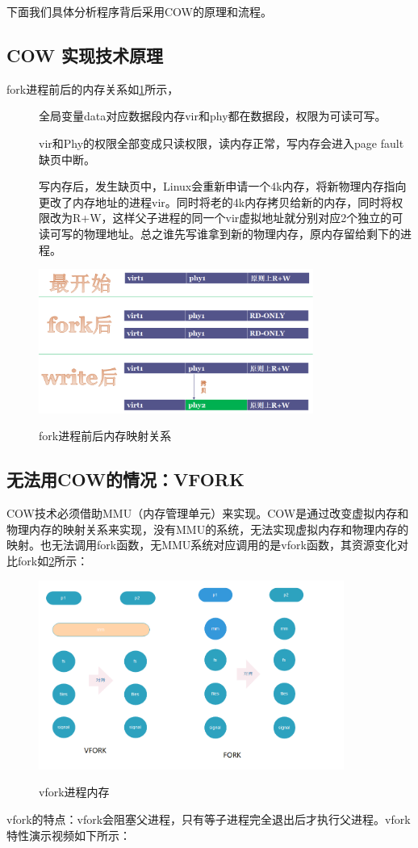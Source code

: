 下面我们具体分析程序背后采用COW的原理和流程。\\
\subsection{COW 实现技术原理}
fork进程前后的内存关系如\ref{linux_fork_mem_compare}所示，
\begin{description}
  \item[] 全局变量data对应数据段内存vir和phy都在数据段，权限为可读可写。
  \item[] vir和Phy的权限全部变成只读权限，读内存正常，写内存会进入page fault缺页中断。
  \item[] 写内存后，发生缺页中，Linux会重新申请一个4k内存，将新物理内存指向更改了内存地址的进程vir。同时将老的4k内存拷贝给新的内存，同时将权限改为R+W，这样父子进程的同一个vir虚拟地址就分别对应2个独立的可读可写的物理地址。总之谁先写谁拿到新的物理内存，原内存留给剩下的进程。
\end{description}
\begin{figure}[H]
 \wdfigbox
  {\caption{fork进程前后内存映射关系}\label{linux_fork_mem_compare}}
  {
  \includegraphics[width=9cm]{./figure/cow_fork_virmem_compare.png}
  }
\end{figure}
\subsection{无法用COW的情况：VFORK}
COW技术必须借助MMU（内存管理单元）来实现。COW是通过改变虚拟内存和物理内存的映射关系来实现，没有MMU的系统，无法实现虚拟内存和物理内存的映射。也无法调用fork函数，无MMU系统对应调用的是vfork函数，其资源变化对比fork如\ref{vfork_mem}所示：
\begin{figure}[H]
 \wdfigbox
  {\caption{vfork进程内存}\label{vfork_mem}}
  {
  \includegraphics[width=10cm]{./figure/vfork_mem.png}
  }
\end{figure}
vfork的特点：vfork会阻塞父进程，只有等子进程完全退出后才执行父进程。vfork特性演示视频如下所示：

